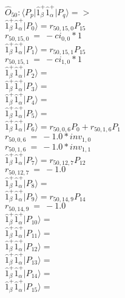 \documentclass[14pt]{article}
\begin{document}
    $\hat{O}_{50}:  \langle{P_p}\vert \hat{1}_{\beta}^{+}\hat{1}_{\alpha}^{+} \vert{P_q}\rangle => $ \\ 
    $ \hat{1}_{\beta}^{+}\hat{1}_{\alpha}^{+} \vert{P_{0}}\rangle = {r}_{50,15,0}P_{15} $ \\ 
    ${r}_{50,15,0}\ =\ -{ci}_{0,0}*1 $ \\ 
    $ \hat{1}_{\beta}^{+}\hat{1}_{\alpha}^{+} \vert{P_{1}}\rangle = {r}_{50,15,1}P_{15} $ \\ 
    ${r}_{50,15,1}\ =\ -{ci}_{1,0}*1 $ \\ 
    $ \hat{1}_{\beta}^{+}\hat{1}_{\alpha}^{+} \vert{P_{2}}\rangle =  $ \\ 
    $ \hat{1}_{\beta}^{+}\hat{1}_{\alpha}^{+} \vert{P_{3}}\rangle =  $ \\ 
    $ \hat{1}_{\beta}^{+}\hat{1}_{\alpha}^{+} \vert{P_{4}}\rangle =  $ \\ 
    $ \hat{1}_{\beta}^{+}\hat{1}_{\alpha}^{+} \vert{P_{5}}\rangle =  $ \\ 
    $ \hat{1}_{\beta}^{+}\hat{1}_{\alpha}^{+} \vert{P_{6}}\rangle = {r}_{50,0,6}P_{0}+{r}_{50,1,6}P_{1} $ \\ 
    ${r}_{50,0,6}\ =\ -1.0*{inv}_{1,0} $ \\ 
    ${r}_{50,1,6}\ =\ -1.0*{inv}_{1,1} $ \\ 
    $ \hat{1}_{\beta}^{+}\hat{1}_{\alpha}^{+} \vert{P_{7}}\rangle = {r}_{50,12,7}P_{12} $ \\ 
    ${r}_{50,12,7}\ =\ -1.0 $ \\ 
    $ \hat{1}_{\beta}^{+}\hat{1}_{\alpha}^{+} \vert{P_{8}}\rangle =  $ \\ 
    $ \hat{1}_{\beta}^{+}\hat{1}_{\alpha}^{+} \vert{P_{9}}\rangle = {r}_{50,14,9}P_{14} $ \\ 
    ${r}_{50,14,9}\ =\ -1.0 $ \\ 
    $ \hat{1}_{\beta}^{+}\hat{1}_{\alpha}^{+} \vert{P_{10}}\rangle =  $ \\ 
    $ \hat{1}_{\beta}^{+}\hat{1}_{\alpha}^{+} \vert{P_{11}}\rangle =  $ \\ 
    $ \hat{1}_{\beta}^{+}\hat{1}_{\alpha}^{+} \vert{P_{12}}\rangle =  $ \\ 
    $ \hat{1}_{\beta}^{+}\hat{1}_{\alpha}^{+} \vert{P_{13}}\rangle =  $ \\ 
    $ \hat{1}_{\beta}^{+}\hat{1}_{\alpha}^{+} \vert{P_{14}}\rangle =  $ \\ 
    $ \hat{1}_{\beta}^{+}\hat{1}_{\alpha}^{+} \vert{P_{15}}\rangle =  $ \\ 
    
\end{document}
